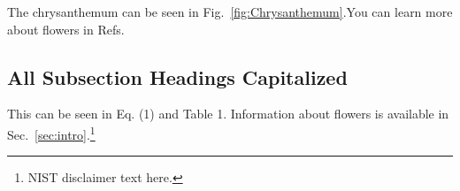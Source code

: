 \documentclass[12pt]{article}
\begin{document}
\normalsize The chrysanthemum can be seen in Fig.~\ref{fig:Chrysanthemum}.You can learn more about flowers in Refs. 
\subsection{All Subsection Headings Capitalized}
\label{ssec:headingscap}
This can be seen in Eq. (1) and Table 1. Information about flowers is available in Sec.~\ref{sec:intro}.\footnote{NIST disclaimer text here.}
\end{document}
